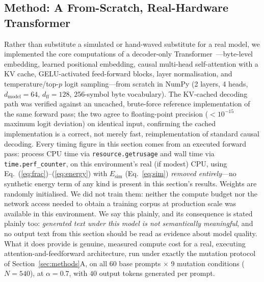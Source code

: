 \documentclass[conference]{IEEEtran}
\begin{document}
\subsection{Method: A From-Scratch, Real-Hardware Transformer}
\label{sec:pilot-method}
Rather than substitute a simulated or hand-waved substitute for a real
model, we implemented the core computations of a decoder-only
Transformer~\cite{vaswani2017attention}---byte-level embedding,
learned positional embedding, causal multi-head self-attention with a
KV cache, GELU-activated feed-forward blocks, layer normalisation, and
temperature/top-$p$ logit sampling---from scratch in NumPy
(2 layers, 4 heads, $d_\text{model}=64$, $d_\text{ff}=128$, 256-symbol
byte vocabulary). The KV-cached decoding path was verified against an
uncached, brute-force reference implementation of the same forward
pass; the two agree to floating-point precision ($<10^{-15}$ maximum
logit deviation) on identical input, confirming the cached
implementation is a correct, not merely fast, reimplementation of
standard causal decoding.
Every timing figure in this section comes from an executed forward
pass: process CPU time via \texttt{resource.getrusage} and wall time
via \texttt{time.perf\_counter}, on this environment's real (if
modest) CPU, using Eq.~(\ref{eq:frac})--(\ref{eq:energy}) with
$E_\text{sim}$ (Eq.~\ref{eq:sim}) \emph{removed entirely}---no
synthetic energy term of any kind is present in this section's
results. Weights are randomly initialised. We did not train them:
neither the compute budget nor the network access needed to obtain a
training corpus at production scale was available in this
environment. We say this plainly, and its consequence is stated
plainly too: \emph{generated text under this model is not semantically
meaningful}, and no output text from this section should be read as
evidence about model quality. What it does provide is genuine,
measured compute cost for a real, executing attention-and-feedforward
architecture, run under exactly the mutation protocol of
Section~\ref{sec:methods}A, on all 60 base prompts $\times$ 9
mutation conditions ($N=540$), at $\alpha=0.7$, with $40$ output
tokens generated per prompt.
\end{document}
